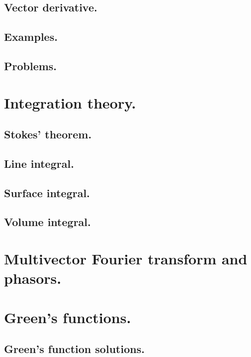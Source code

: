       \subsection{Vector derivative.}
         
      \subsection{Examples.}
         
      \subsection{Problems.}
         
         
         
   \section{Integration theory.}
      
   \subsection{Stokes' theorem.}
      
   \subsection{Line integral.}
      
   \subsection{Surface integral.}
      
   \subsection{Volume integral.}
      
   \section{Multivector Fourier transform and phasors.}
      
   \section{Green's functions.}
      
      \subsection{Green's function solutions.}
         
